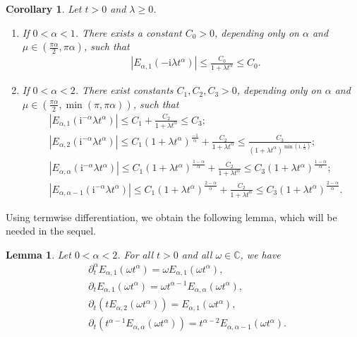 \documentclass[reqno]{amsart}
\newtheorem{lem}[theorem]{Lemma}
\newtheorem{cor}[theorem]{Corollary}
\numberwithin{equation}{section}
\begin{document}
\begin{cor}
\label{est12}
Let $t>0$ and $\lambda\ge 0$.
\begin{enumerate}
    \item If $0<\alpha<1$. There exists a constant $C_0>0$, depending only on $\alpha$ and $\mu \in\left(\frac{\pi \alpha}{2}, \pi \alpha \right)$, such that
\begin{align}\label{es0}
& \left|E_{\alpha, 1}\left(-\mathrm{i} \lambda t^\alpha\right)\right| \leq \frac{C_0}{1+\lambda t^\alpha} \leq C_0.
\end{align}
\item If $0<\alpha<2$. There exist constants $C_1, C_2, C_3>0$, depending only on $\alpha$ and $\mu \in\left(\frac{\pi \alpha}{2},\min(\pi,\pi \alpha) \right)$, such that
\begin{align}
& \left|E_{\alpha, 1}\left(\mathrm{i}^{-\alpha} \lambda t^\alpha\right)\right| \leq C_1+\frac{C_2}{1+\lambda t^\alpha} \leq C_3; \label{es1}\\
& \left|E_{\alpha, 2}\left(\mathrm{i}^{-\alpha} \lambda t^\alpha\right)\right| \leq C_1\left(1+\lambda t^\alpha\right)^{\frac{-1}{\alpha}}+\frac{C_2}{1+\lambda t^\alpha} \leq \frac{C_3}{\left(1+\lambda t^\alpha\right)^{\min(1,\frac{1}{\alpha})}}; \label{es2}\\
& \left|E_{\alpha, \alpha}\left(\mathrm{i}^{-\alpha} \lambda t^\alpha\right)\right| \leq C_1\left(1+\lambda t^\alpha\right)^{\frac{1-\alpha}{\alpha}}+\frac{C_2}{1+\lambda t^\alpha} \leq C_3\left(1+\lambda t^\alpha\right)^{\frac{1-\alpha}{\alpha}}; \label{es3}\\
& \left|E_{\alpha, \alpha-1}\left(\mathrm{i}^{-\alpha} \lambda t^\alpha\right)\right| \leq C_1\left(1+\lambda t^\alpha\right)^{\frac{2-\alpha}{\alpha}}+\frac{C_2}{1+\lambda t^\alpha} \leq C_3\left(1+\lambda t^\alpha\right)^{\frac{2-\alpha}{\alpha}}. \label{es4}
\end{align}
\end{enumerate}
\end{cor}

Using termwise differentiation, we obtain the following lemma, which will be needed in the sequel.
\begin{lem}
    Let $0<\alpha<2$. For all $t>0$ and all $\omega\in\mathbb{C}$, we have
    \begin{align}
        &\partial_t^\alpha E_{\alpha,1}(\omega t^{\alpha})=\omega E_{\alpha,1}(\omega t^{\alpha}), \label{derivative0_ML}\\
        &\partial_t E_{\alpha,1}(\omega t^{\alpha})=\omega t^{\alpha-1}E_{\alpha,\alpha}(\omega t^{\alpha}), \label{derivative1_ML}\\
        &\partial_t \left(tE_{\alpha,2}(\omega t^{\alpha})\right)=E_{\alpha,1}(\omega t^{\alpha}), \label{derivative2_ML}\\
        &\partial_t \left(t^{\alpha-1}E_{\alpha,\alpha}(\omega t^{\alpha})\right)=t^{\alpha-2}E_{\alpha,\alpha-1}(\omega t^{\alpha}). \label{derivative3_ML}
    \end{align}
\end{lem}
\end{document}
